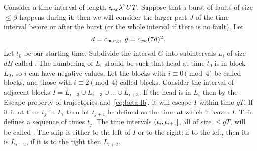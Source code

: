 \documentclass[11pt]{memoir}
\theoremstyle{definition} %
\renewcommand{\le}{\leq}
\def\B{B}
\def\U{U}
\renewcommand{\d}{d}
\newcommand{\g}{g}
\newcommand{\Tu}{T}
\newcommand{\cns}[1]{c_{\textrm{\upshape #1}}}
\newcommand{\CEsc}{\cns{esc}}
\newcommand{\CMarg}{\cns{marg}}
\begin{document}
\begin{Proof}
  Consider a time interval of length \( \CEsc\lambda^{2}\U\Tu \).
  Suppose that a burst of faults of size \( \le\beta \) happens during it: then we will consider the
  larger part \( J \) of the time interval
  before or after the burst (or the whole interval if there is no fault).
  Let 
\begin{align*}
 \d=\CMarg,\; \g = \CEsc(7\d)^{2}.
\end{align*}
Let \( t_{0} \) be our starting time.
Subdivide the interval \( G \) into subintervals \( L_{i} \) of size \( \d\B \) called .
The numbering of \( L_{i} \) should be such that head at time \( t_{0} \) is in block \( L_{0} \),
so \( i \) can have negative values.
Let the blocks with \( i\equiv 0\pmod 4 \) be called  blocks, and those
with \( i\equiv 2\pmod 4 \) called  blocks. 
Consider the interval of adjacent blocks \( I=L_{i-3}\cup L_{i-3}\cup\dots\cup L_{i+3} \).
If the head is in \( L_{i} \) then by the Escape property of trajectories and~\eqref{eq:beta-lb},
it will escape \( I \) within time \( \g\Tu \).
If it is at time \( t_{j} \) in \( L_{i} \) then let \( t_{j+1} \) be defined
as the time at which it leaves \( I \).
This defines a sequence of times \( t_{j} \).
The time intervals \( (t_{i},t_{i+1}] \), all of size \( \le\g\Tu \), will be called .
The skip is either to the left of \( I \) or to the right: if to the left, then its 
is \( L_{i-2} \), if it is to the right then \( L_{i+2} \).


\end{Proof}
\end{document}
